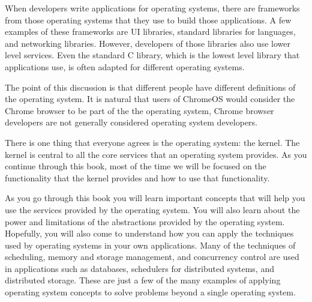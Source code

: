\documentclass{article}
\begin{document}
When developers write applications for operating systems, there are frameworks from those operating systems that they use to build those applications.
A few examples of these frameworks are UI libraries, standard libraries for languages, and networking libraries.
However, developers of those libraries also use lower level services.
Even the standard C library, which is the lowest level library that applications use, is often adapted for different operating systems.

The point of this discussion is that different people have different definitions of the operating system.
It is natural that users of ChromeOS would consider the Chrome browser to be part of the the operating system, Chrome browser developers are not generally considered operating system developers.

There is one thing that everyone agrees is the operating system: the kernel.
The kernel is central to all the core services that an operating system provides.
As you continue through this book, most of the time we will be focused on the functionality that the kernel provides and how to use that functionality.

As you go through this book you will learn important concepts that will help you use the services provided by the operating system.
You will also learn about the power and limitations of the abstractions provided by the operating system.
Hopefully, you will also come to understand how you can apply the techniques used by operating systems in your own applications.
Many of the techniques of scheduling, memory and storage management, and concurrency control are used in applications such as databases, schedulers for distributed systems, and distributed storage.
These are just a few of the many examples of applying operating system concepts to solve problems beyond a single operating system.



\end{document}
